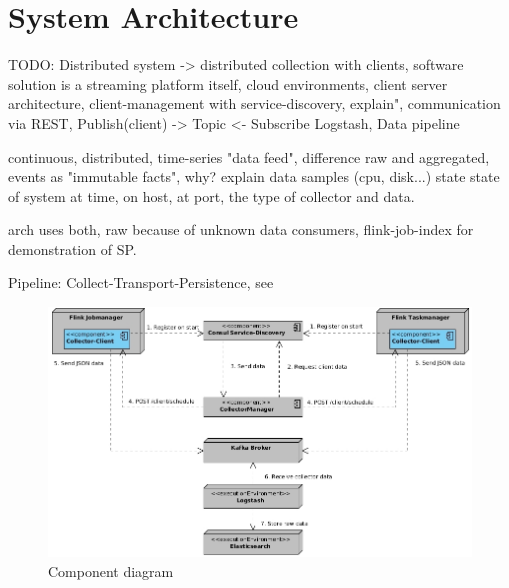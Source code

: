 \chapter{System Architecture}
%
%
%
%

TODO:
Distributed system -> distributed collection with clients, software solution is a streaming platform itself,
cloud environments, client server architecture, client-management with service-discovery, explain", communication via REST,
Publish(client) -> Topic <- Subscribe Logstash, Data pipeline

continuous, distributed, time-series "data feed", difference raw and aggregated\cite{Klepp16},
events as "immutable facts", why? explain data samples (cpu, disk...)
state state of system at time, on host, at port, the type of collector and data.

arch uses both, raw because of unknown data consumers, flink-job-index for demonstration
of SP.

Pipeline: Collect-Transport-Persistence, see \cite{VanL14}

\begin{figure}[H]
	\centering
	\includegraphics[width=1.0\textwidth]{../uml/component-diagram.jpg}
	\caption{Component diagram}
	\label{component-diagram}
\end{figure}

